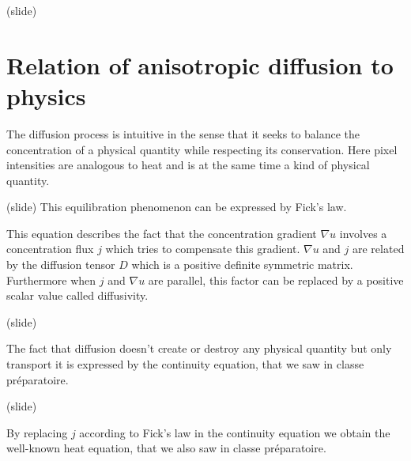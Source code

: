 \documentclass{article}
\begin{document}
(slide)



\section{Relation of anisotropic diffusion to physics}

The diffusion process is intuitive in the sense that it seeks to balance the concentration of a physical quantity while respecting its conservation. Here pixel intensities are analogous to heat and is at the same time a kind of physical quantity.

(slide)
This equilibration phenomenon can be expressed by Fick's law.%

This equation describes the fact that the concentration gradient $\nabla u$ involves a concentration flux $j$ which tries to compensate this gradient. $\nabla u$ and $j$ are related by the diffusion tensor $D$ which is a positive definite symmetric matrix. Furthermore when $j$ and $\nabla u$ are parallel, this factor can be replaced by a positive scalar value called diffusivity. %

(slide)

The fact that diffusion doesn't create or destroy any physical quantity but only transport it is expressed by the continuity equation, that we saw in classe préparatoire.%

(slide)

By replacing $j$ according to Fick's law in the continuity equation we obtain the well-known heat equation, that we also saw in classe préparatoire.%
\end{document}
